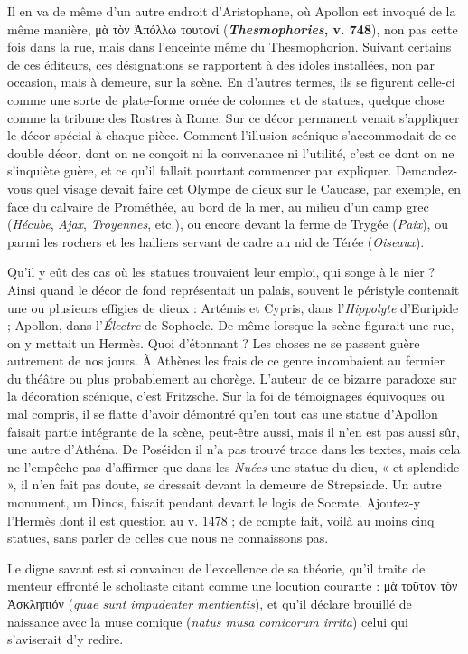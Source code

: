 \documentclass{book}%
\newcommand{\italique}[1]{\textit{#1}}%
\begin{document}
Il en va de même d'un autre endroit d'Aristophane, où Apollon est invoqué de la même manière, μὰ τὸν Ἀπόλλω τουτονί (\textbf{\italique{Thesmophories}, v. 748}), non pas cette fois dans la rue, mais dans l'enceinte même du Thesmophorion. Suivant certains de ces éditeurs, ces désignations se rapportent à des idoles installées, non par occasion, mais à demeure, sur la scène. En d'autres termes, ils se figurent celle-ci comme une sorte de plate-forme ornée de colonnes et de statues, quelque chose comme la tribune des Rostres à Rome. Sur ce décor permanent venait s'appliquer le décor spécial à chaque pièce. Comment l'illusion scénique s'accommodait de ce double décor, dont on ne conçoit ni la convenance ni l'utilité, c'est ce dont on ne s'inquiète guère, et ce qu'il fallait pourtant commencer par expliquer. Demandez-vous quel visage devait faire cet Olympe de dieux sur le Caucase, par exemple, en face du calvaire de Prométhée, au bord de la mer, au milieu d'un camp grec (\italique{Hécube}, \italique{Ajax}, \italique{Troyennes}, etc.), ou encore devant la ferme de Trygée (\italique{Paix}), ou parmi les rochers et les halliers servant de cadre au nid de Térée (\italique{Oiseaux}). 

Qu'il y eût des cas où les statues trouvaient leur emploi, qui songe à le nier ? Ainsi quand le décor de fond représentait un palais, souvent le péristyle contenait une ou plusieurs effigies de dieux : Artémis et Cypris, dans l'\italique{Hippolyte} d'Euripide ; Apollon, dans l'\italique{Électre} de Sophocle. De même lorsque la scène figurait une rue, on y mettait un Hermès. Quoi d'étonnant ? Les choses ne se passent guère autrement de nos jours. À Athènes les frais de ce genre incombaient au fermier du théâtre ou plus probablement au chorège. L'auteur de ce bizarre paradoxe sur la décoration scénique, c'est Fritzsche. Sur la foi de témoignages équivoques ou mal compris, il se flatte d'avoir démontré qu'en tout cas une statue d'Apollon faisait partie intégrante de la scène, peut-être aussi, mais il n'en est pas aussi sûr, une autre d'Athéna. De Poséidon il n'a pas trouvé trace dans les textes, mais cela ne l'empêche pas d'affirmer que dans les \italique{Nuées} une statue du dieu, « et splendide », il n'en fait pas doute, se dressait devant la demeure de Strepsiade. 
Un autre monument, un Dinos, faisait pendant devant le logis de Socrate. Ajoutez-y l'Hermès dont il est question au v. 1478 ; de compte fait, voilà au moins cinq statues, sans parler de celles que nous ne connaissons pas. 

Le digne savant est si convaincu de l'excellence de sa théorie, qu'il traite de menteur effronté le scholiaste citant comme une locution courante : μὰ τοῦτον τὸν Ἀσκληπιόν (\italique{quae sunt impudenter mentientis}), et qu'il déclare brouillé de naissance avec la muse comique (\italique{natus musa comicorum irrita}) celui qui s'aviserait d'y redire. 
\end{document}
